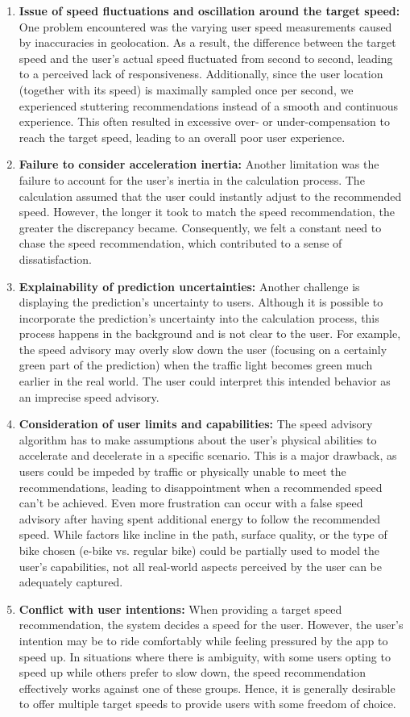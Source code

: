 \begin{enumerate}
\item \textbf{Issue of speed fluctuations and oscillation around the target speed:} One problem encountered was the varying user speed measurements caused by inaccuracies in geolocation. As a result, the difference between the target speed and the user's actual speed fluctuated from second to second, leading to a perceived lack of responsiveness. Additionally, since the user location (together with its speed) is maximally sampled once per second, we experienced stuttering recommendations instead of a smooth and continuous experience. This often resulted in excessive over- or under-compensation to reach the target speed, leading to an overall poor user experience.
\item \textbf{Failure to consider acceleration inertia:} Another limitation was the failure to account for the user's inertia in the calculation process. The calculation assumed that the user could instantly adjust to the recommended speed. However, the longer it took to match the speed recommendation, the greater the discrepancy became. Consequently, we felt a constant need to chase the speed recommendation, which contributed to a sense of dissatisfaction.
\item \textbf{Explainability of prediction uncertainties:} Another challenge is displaying the prediction's uncertainty to users. Although it is possible to incorporate the prediction's uncertainty into the calculation process, this process happens in the background and is not clear to the user. For example, the speed advisory may overly slow down the user (focusing on a certainly green part of the prediction) when the traffic light becomes green much earlier in the real world. The user could interpret this intended behavior as an imprecise speed advisory.
\item \textbf{Consideration of user limits and capabilities:} The speed advisory algorithm has to make assumptions about the user's physical abilities to accelerate and decelerate in a specific scenario. This is a major drawback, as users could be impeded by traffic or physically unable to meet the recommendations, leading to disappointment when a recommended speed can't be achieved. Even more frustration can occur with a false speed advisory after having spent additional energy to follow the recommended speed. While factors like incline in the path, surface quality, or the type of bike chosen (e-bike vs. regular bike) could be partially used to model the user's capabilities, not all real-world aspects perceived by the user can be adequately captured.
\item \textbf{Conflict with user intentions:} When providing a target speed recommendation, the system decides a speed for the user. However, the user's intention may be to ride comfortably while feeling pressured by the app to speed up. In situations where there is ambiguity, with some users opting to speed up while others prefer to slow down, the speed recommendation effectively works against one of these groups. Hence, it is generally desirable to offer multiple target speeds to provide users with some freedom of choice.
\end{enumerate}
 
